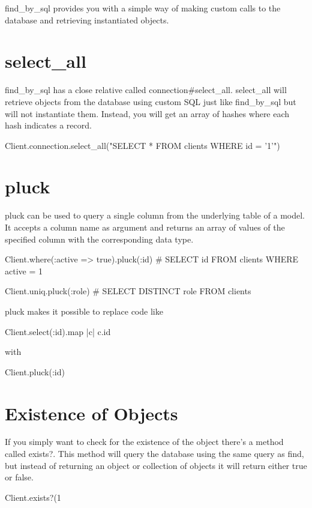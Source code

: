 \documentclass[10pt]{book}
\newenvironment{code}{%
  \scriptsize
    \verbatim
}{%
    \endverbatim
    \newline
}
\begin{document}
find\_by\_sql provides you with a simple way of making custom calls to the database and retrieving instantiated objects.

\section{ select\_all}

find\_by\_sql has a close relative called connection\#select\_all. select\_all will retrieve objects from the database using custom SQL just like find\_by\_sql but will not instantiate them. Instead, you will get an array of hashes where each hash indicates a record.
\begin{code}
Client.connection.select_all("SELECT * FROM clients WHERE id = '1'")
\end{code}

\section{ pluck}

pluck can be used to query a single column from the  underlying table of a model. It accepts a column name as argument and  returns an array of values of the specified column with the  corresponding data type.
\begin{code}
Client.where(:active => true).pluck(:id)
# SELECT id FROM clients WHERE active = 1
 
Client.uniq.pluck(:role)
# SELECT DISTINCT role FROM clients
\end{code}

pluck makes it possible to replace code like
\begin{code}
Client.select(:id).map { |c| c.id }
\end{code}

with
\begin{code}
Client.pluck(:id)
\end{code}

\section{ Existence of Objects}

If you simply want to check for the existence of the object there’s a method called exists?. This method will query the database using the same query as find, but instead of returning an object or collection of objects it will return either true or false.
\begin{code}
Client.exists?(1
\end{code}
\end{document}
